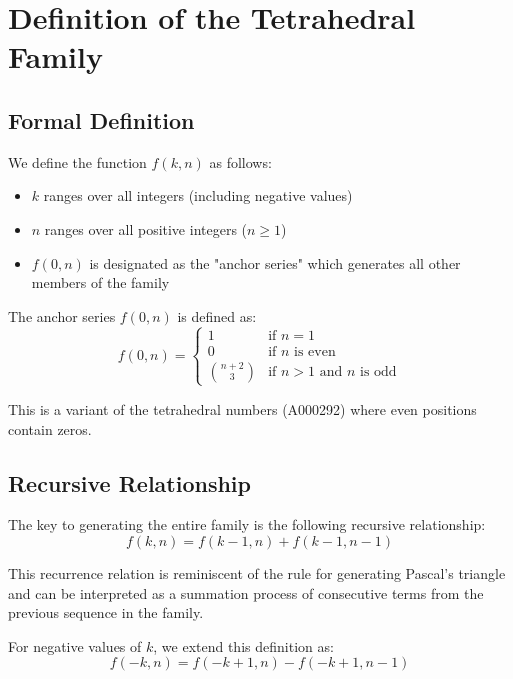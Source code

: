 \documentclass[12pt,a4paper]{article}
\begin{document}
\section{Definition of the Tetrahedral Family}

\subsection{Formal Definition}

We define the function $f(k,n)$ as follows:

\begin{itemize}
    \item $k$ ranges over all integers (including negative values)
    \item $n$ ranges over all positive integers ($n \geq 1$)
    \item $f(0,n)$ is designated as the "anchor series" which generates all other members of the family
\end{itemize}

The anchor series $f(0,n)$ is defined as:
\begin{equation}
f(0,n) = \begin{cases}
1 & \text{if } n = 1 \\
0 & \text{if } n \text{ is even} \\
\binom{n+2}{3} & \text{if } n > 1 \text{ and } n \text{ is odd}
\end{cases}
\end{equation}

This is a variant of the tetrahedral numbers (A000292) where even positions contain zeros.

\subsection{Recursive Relationship}

The key to generating the entire family is the following recursive relationship:
\begin{equation}
f(k,n) = f(k-1,n) + f(k-1,n-1)
\end{equation}

This recurrence relation is reminiscent of the rule for generating Pascal's triangle and can be interpreted as a summation process of consecutive terms from the previous sequence in the family.

For negative values of $k$, we extend this definition as:
\begin{equation}
f(-k,n) = f(-k+1,n) - f(-k+1,n-1)
\end{equation}
\end{document}
